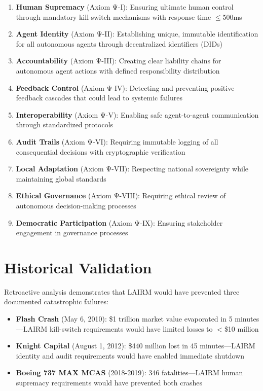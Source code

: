 \documentclass[12pt,a4paper,twoside,openright]{book}
\begin{document}
\begin{enumerate}
    \item \textbf{Human Supremacy} (Axiom Ψ-I): Ensuring ultimate human control through mandatory kill-switch mechanisms with response time $\leq$500ms
    
    \item \textbf{Agent Identity} (Axiom Ψ-II): Establishing unique, immutable identification for all autonomous agents through decentralized identifiers (DIDs)
    
    \item \textbf{Accountability} (Axiom Ψ-III): Creating clear liability chains for autonomous agent actions with defined responsibility distribution
    
    \item \textbf{Feedback Control} (Axiom Ψ-IV): Detecting and preventing positive feedback cascades that could lead to systemic failures
    
    \item \textbf{Interoperability} (Axiom Ψ-V): Enabling safe agent-to-agent communication through standardized protocols
    
    \item \textbf{Audit Trails} (Axiom Ψ-VI): Requiring immutable logging of all consequential decisions with cryptographic verification
    
    \item \textbf{Local Adaptation} (Axiom Ψ-VII): Respecting national sovereignty while maintaining global standards
    
    \item \textbf{Ethical Governance} (Axiom Ψ-VIII): Requiring ethical review of autonomous decision-making processes
    
    \item \textbf{Democratic Participation} (Axiom Ψ-IX): Ensuring stakeholder engagement in governance processes
\end{enumerate}

\vspace{0.5cm}

\section*{Historical Validation}

Retroactive analysis demonstrates that LAIRM would have prevented three documented catastrophic failures:

\begin{itemize}
    \item \textbf{Flash Crash} (May 6, 2010): \$1 trillion market value evaporated in 5 minutes—LAIRM kill-switch requirements would have limited losses to $<$\$10 million
    
    \item \textbf{Knight Capital} (August 1, 2012): \$440 million lost in 45 minutes—LAIRM identity and audit requirements would have enabled immediate shutdown
    
    \item \textbf{Boeing 737 MAX MCAS} (2018-2019): 346 fatalities—LAIRM human supremacy requirements would have prevented both crashes
\end{itemize}
\end{document}
